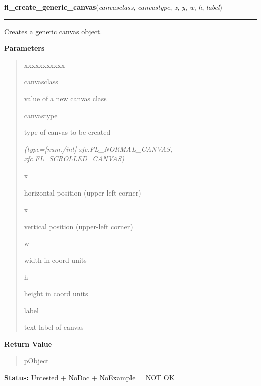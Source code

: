 \hspace{.8\funcindent}\begin{boxedminipage}{\funcwidth}

    \raggedright \textbf{fl\_create\_generic\_canvas}(\textit{canvasclass}, \textit{canvastype}, \textit{x}, \textit{y}, \textit{w}, \textit{h}, \textit{label})

    \vspace{-1.5ex}

    \rule{\textwidth}{0.5\fboxrule}
\setlength{\parskip}{2ex}
    Creates a generic canvas object.

\setlength{\parskip}{1ex}
      \textbf{Parameters}
      \vspace{-1ex}

      \begin{quote}
        \begin{Ventry}{xxxxxxxxxxx}

          \item[canvasclass]

          value of a new canvas class

          \item[canvastype]

          type of canvas to be created

            {\it (type=[num./int] xfc.FL\_NORMAL\_CANVAS, xfc.FL\_SCROLLED\_CANVAS)}

          \item[x]

          horizontal position (upper-left corner)

          \item[x]

          vertical position (upper-left corner)

          \item[w]

          width in coord units

          \item[h]

          height in coord units

          \item[label]

          text label of canvas

        \end{Ventry}

      \end{quote}

      \textbf{Return Value}
    \vspace{-1ex}

      \begin{quote}
      pObject

      \end{quote}

\textbf{Status:} Untested + NoDoc + NoExample = NOT OK



    \end{boxedminipage}

